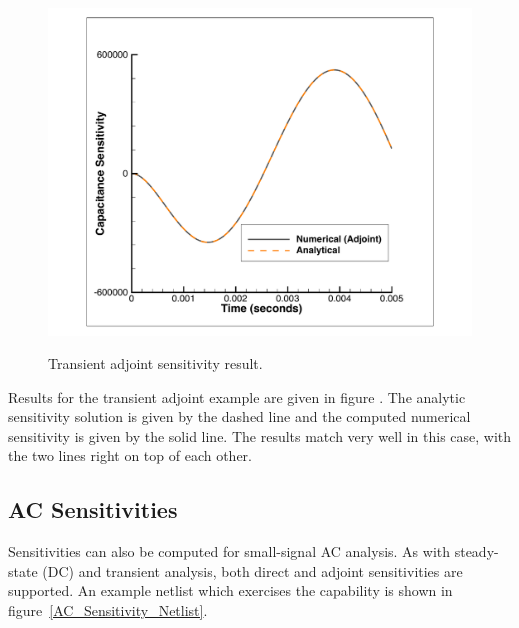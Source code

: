 \begin{figure}[ht]
  \centering
  \scalebox{0.5}
  {\includegraphics[]{sensCapGearAdj}}
  \caption[Transient adjoint sensitivity result]
  {Transient adjoint sensitivity result.
\label{transientAdjointSensitivityResult}}
\end{figure}
Results for the transient adjoint example are given in figure .  The
analytic sensitivity solution is given by the dashed line and the
computed numerical sensitivity is given by the solid line.  The
results match very well in this case, with the two lines right on top
of each other.

\clearpage
\subsection{AC Sensitivities}
Sensitivities can also be computed for small-signal AC analysis.  As
with steady-state (DC) and transient analysis, both direct and adjoint
sensitivities are supported.  An example netlist which exercises the
capability is shown in figure~\ref{AC_Sensitivity_Netlist}.

